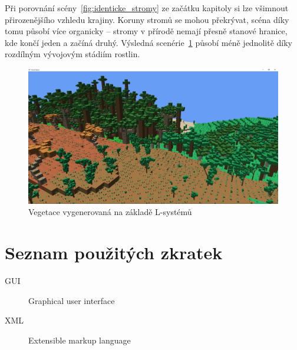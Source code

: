 \documentclass[thesis=M,czech]{FITthesis}[2019/12/23]
\begin{document}
Při porovnání scény~\ref{fig:identicke_stromy} ze začátku kapitoly si lze všimnout přirozenějšího vzhledu krajiny. Koruny stromů se mohou překrývat, scéna díky tomu působí více organicky -- stromy v přírodě nemají přesně stanové hranice, kde končí jeden a začíná druhý. Výsledná scenérie~\ref{fig:new_vegetation} působí méně jednolitě díky rozdílným vývojovým stádiím rostlin.

\begin{figure}\centering
	\includegraphics[width=\textwidth]{images/new_vegetation}
	\caption[Vegetace vygenerovaná na základě L-systémů]{Vegetace vygenerovaná na základě L-systémů}\label{fig:new_vegetation}
\end{figure}


\begin{conclusion}
\end{conclusion}




\appendix

\chapter{Seznam použitých zkratek}
\begin{description}
	\item[GUI] Graphical user interface
	\item[XML] Extensible markup language
\end{description}
\end{document}
